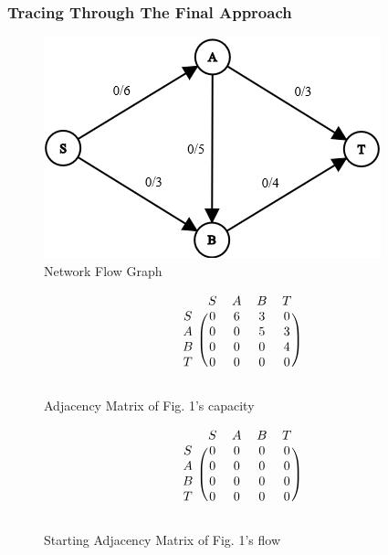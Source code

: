     \subsubsection{Tracing Through The Final Approach}
        \begin{figure}[H]
            \centering
            \includegraphics[scale=0.80]{figures/graph.png}
            \caption{Network Flow Graph}
        \end{figure}
    
        \begin{figure}[H]
            \centering
            \[
                \begin{blockarray}{ccccc}
                    & S & A & B & T \\
                    \begin{block}{c(cccc)}
                        S & 0 & 6 & 3 & 0 \\
                        A & 0 & 0 & 5 & 3 \\
                        B & 0 & 0 & 0 & 4 \\
                        T & 0 & 0 & 0 & 0 \\
                    \end{block}
                \end{blockarray}
            \]
            \caption{Adjacency Matrix of Fig. 1's capacity}
        \end{figure}
        
        \begin{figure}[H]
            \centering
            \[
                \begin{blockarray}{ccccc}
                    & S & A & B & T \\
                    \begin{block}{c(cccc)}
                        S & 0 & 0 & 0 & 0 \\
                        A & 0 & 0 & 0 & 0 \\
                        B & 0 & 0 & 0 & 0 \\
                        T & 0 & 0 & 0 & 0 \\
                    \end{block}
                \end{blockarray}
            \]
            \caption{Starting Adjacency Matrix of Fig. 1's flow}
        \end{figure}
        
